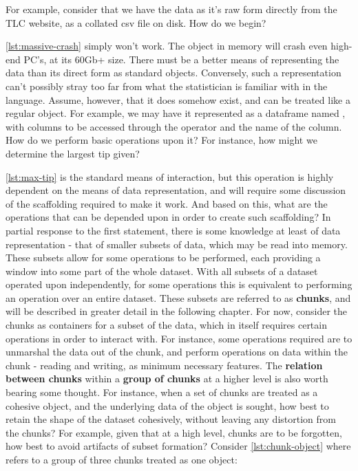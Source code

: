 For example, consider that we have the data as it's raw form directly
from the TLC website, as a collated csv file on disk. How do we begin?


\cref{lst:massive-crash} simply won't work. The object in memory will crash even high-end
PC's, at its 60Gb+ size. There must be a better means of representing
the data than its direct form as standard \R objects. Conversely, such a
representation can't possibly stray too far from what the statistician
is familiar with in the language. Assume, however, that it does somehow
exist, and can be treated like a regular object. For example, we may
have it represented as a dataframe named , with
columns to be accessed through the  operator and the name of
the column. How do we perform basic operations upon it? For instance,
how might we determine the largest tip given?


\cref{lst:max-tip} is the standard means of interaction, but this operation is highly
dependent on the means of data representation, and will require some
discussion of the scaffolding required to make it work. And based on
this, what are the operations that can be depended upon in order to
create such scaffolding? In partial response to the first statement,
there is some knowledge at least of data representation - that of
smaller subsets of data, which may be read into memory. These subsets
allow for some operations to be performed, each providing a window into
some part of the whole dataset. With all subsets of a dataset operated
upon independently, for some operations this is equivalent to performing
an operation over an entire dataset. These subsets are referred to as
\textbf{chunks}, and will be described in greater detail in the
following chapter. For now, consider the chunks as containers for a
subset of the data, which in itself requires certain operations in order
to interact with. For instance, some operations required are to
unmarshal the data out of the chunk, and perform operations on data
within the chunk - reading and writing, as minimum necessary features.
The \textbf{relation between chunks} within a \textbf{group of chunks}
at a higher level is also worth bearing some thought. For instance, when
a set of chunks are treated as a cohesive object, and the underlying
data of the object is sought, how best to retain the shape of the
dataset cohesively, without leaving any distortion from the chunks? For
example, given that at a high level, chunks are to be forgotten, how
best to avoid artifacts of subset formation? Consider \cref{lst:chunk-object}
where  refers to a group of three chunks treated as one
object:


